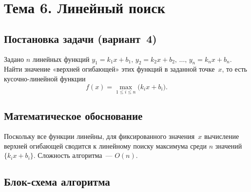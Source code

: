 \section{Тема 6. Линейный поиск}

\subsection{Постановка задачи (вариант~4)}

Задано $n$ линейных функций $y_1=k_1x+b_1,\,y_2=k_2x+b_2,\,\ldots,\,
y_n=k_nx+b_n$. Найти значение «верхней огибающей» этих функций
в заданной точке~$x$, то есть кусочно-линейной функции
\[
  f(x) = \max_{1 \le i \le n}\bigl(k_i x + b_i\bigr).
\]

\subsection{Математическое обоснование}

Поскольку все функции линейны, для фиксированного значения~$x$
вычисление верхней огибающей сводится к линейному поиску
максимума среди $n$ значений $\{k_i x + b_i\}$.
Сложность алгоритма~--- $O(n)$.

\subsection{Блок-схема алгоритма}

